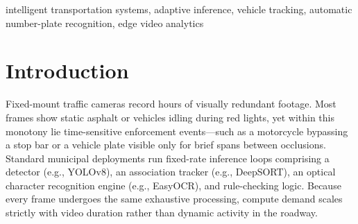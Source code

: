 \begin{abstract}
Conventional automated traffic monitoring pipelines execute heavy computer vision models---specifically deep object detectors and text recognizers---on every video frame at a fixed rate. In typical surveillance streams, this burns compute on static backgrounds and passes motion-blurred vehicle crops to the recognizer, yielding noisy and unstable plate records. We introduce RATG-OC (Risk-Adaptive Temporal Gating and Track-Level OCR Consensus), a drop-in scheduling layer that wraps existing YOLOv8, DeepSORT, and EasyOCR pipelines without modifying model weights. RATG-OC evaluates an interpretable scalar risk score for each incoming frame based on background pixel displacement, Kalman tracker covariance growth, boundary proximity to enforcement lines, and track-level plate confidence. Low-risk frames bypass deep detection entirely, updating active tracks through linear motion projection. Vehicle crops undergo OCR only after satisfying a Laplacian sharpness criterion, with recognized strings pooled across frames into a track-indexed voting buffer to resolve a single consensus identifier. Evaluated on a 720p, 30-FPS intersection recording, RATG-OC lifts throughput from 8.7 to 18.9 frames per second, cuts mean per-frame latency from 114.9\,ms to 52.9\,ms, and reduces OCR inferences by 71.8\%. Temporal consensus filtering also improves exact license plate recognition from 84.3\% (70/83) to 89.2\% (74/83), while vehicle detection mAP@0.5 remains steady at 90.4\%.
\end{abstract}

\begin{IEEEkeywords}
intelligent transportation systems, adaptive inference, vehicle tracking, automatic number-plate recognition, edge video analytics
\end{IEEEkeywords}

\section{Introduction}
Fixed-mount traffic cameras record hours of visually redundant footage. Most frames show static asphalt or vehicles idling during red lights, yet within this monotony lie time-sensitive enforcement events---such as a motorcycle bypassing a stop bar or a vehicle plate visible only for brief spans between occlusions. Standard municipal deployments run fixed-rate inference loops comprising a detector (e.g., YOLOv8), an association tracker (e.g., DeepSORT), an optical character recognition engine (e.g., EasyOCR), and rule-checking logic. Because every frame undergoes the same exhaustive processing, compute demand scales strictly with video duration rather than dynamic activity in the roadway.

